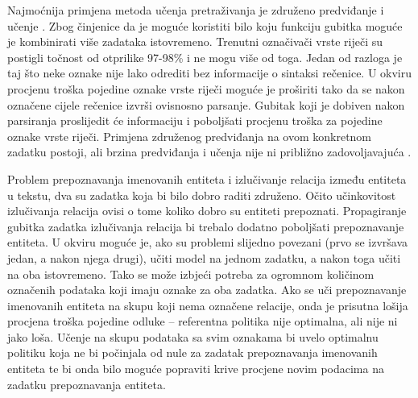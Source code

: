 Najmoćnija primjena metoda učenja pretraživanja je združeno predviđanje i učenje
. Zbog činjenice da je moguće koristiti bilo
koju funkciju gubitka moguće je kombinirati više zadataka istovremeno. Trenutni
označivači vrste riječi su postigli točnost od otprilike 97-98\%
\citep{manning2011part} i ne mogu više od toga. Jedan od razloga je taj što neke
oznake nije lako odrediti bez informacije o sintaksi rečenice. U \lts{} okviru
procjenu troška pojedine oznake vrste riječi moguće je proširiti tako da se
nakon označene cijele rečenice izvrši ovisnosno parsanje. Gubitak koji je
dobiven nakon parsiranja proslijedit će informaciju i poboljšati procjenu
troška za pojedine oznake vrste riječi. Primjena združenog predviđanja na ovom
konkretnom zadatku postoji, ali brzina predviđanja i učenja nije ni približno
zadovoljavajuća \citep{bohnet2012transition}.

Problem prepoznavanja imenovanih entiteta i izlučivanje relacija između entiteta
u tekstu, dva su zadatka koja bi bilo dobro raditi združeno. Očito učinkovitost
izlučivanja relacija ovisi o tome koliko dobro su entiteti prepoznati.
Propagiranje gubitka zadatka izlučivanja relacija bi trebalo dodatno poboljšati
prepoznavanje entiteta. U \lts{} okviru moguće je, ako su problemi slijedno
povezani (prvo se izvršava jedan, a nakon njega drugi), učiti model na jednom
zadatku, a nakon toga učiti na oba istovremeno. Tako se može izbjeći potreba za
ogromnom količinom označenih podataka koji imaju oznake za oba zadatka. Ako se
uči prepoznavanje imenovanih entiteta na skupu koji nema označene relacije, onda
je prisutna lošija procjena troška pojedine odluke -- referentna politika nije
optimalna, ali nije ni jako loša. Učenje na skupu podataka sa svim oznakama bi
uvelo optimalnu politiku koja ne bi počinjala od nule za zadatak prepoznavanja
imenovanih entiteta te bi onda bilo moguće popraviti krive procjene novim
podacima na zadatku prepoznavanja entiteta.

